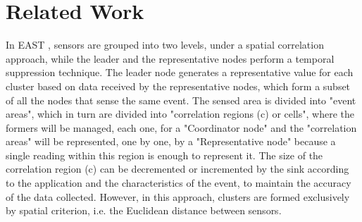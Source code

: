 \documentclass{acm_proc_article-sp}
\begin{document}
\section{Related Work}
\label{related-work}


In EAST \cite{Villas2012}, sensors are grouped into two levels, under a spatial
correlation approach, while the leader and the representative nodes perform a
temporal suppression technique.
The leader node generates a representative value for each cluster based on data
received by the representative nodes, which form a subset of all the nodes that
sense the same event. The sensed area is divided into "event areas", which in
turn are divided into "correlation regions (c) or cells", where the formers will
be managed, each one, for a "Coordinator node" and the "correlation areas" will
be represented, one by one, by a "Representative node" because a single reading
within this region is enough to represent it.
The size of the correlation region (c) can be decremented or incremented by the
sink according to the application and the characteristics of the event, to
maintain the accuracy of the data collected. However, in this approach, clusters
are formed exclusively by spatial criterion, i.e. the Euclidean distance between
sensors.
\end{document}
